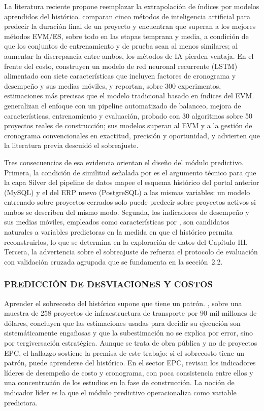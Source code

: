 La literatura reciente propone reemplazar la extrapolación de índices por modelos aprendidos del histórico. \textcite{Wauters2016} comparan cinco métodos de inteligencia artificial para predecir la duración final de un proyecto y encuentran que superan a los mejores métodos EVM/ES, sobre todo en las etapas temprana y media, a condición de que los conjuntos de entrenamiento y de prueba sean al menos similares; al aumentar la discrepancia entre ambos, los métodos de IA pierden ventaja. En el frente del costo, \textcite{MLcostForecasting2022} construyen un modelo de red neuronal recurrente (LSTM) alimentado con siete características que incluyen factores de cronograma y desempeño y sus medias móviles, y reportan, sobre 300 experimentos, estimaciones más precisas que el modelo tradicional basado en índices del EVM\@. \textcite{AutoMLpipeline2025} generalizan el enfoque con un pipeline automatizado de balanceo, mejora de características, entrenamiento y evaluación, probado con 30 algoritmos sobre 50 proyectos reales de construcción; sus modelos superan al EVM y a la gestión de cronograma convencionales en exactitud, precisión y oportunidad, y advierten que la literatura previa descuidó el sobreajuste.

Tres consecuencias de esa evidencia orientan el diseño del módulo predictivo. Primera, la condición de similitud señalada por \textcite{Wauters2016} es el argumento técnico para que la capa Silver del pipeline de datos mapee el esquema histórico del portal anterior (MySQL) y el del ERP nuevo (PostgreSQL) a las mismas variables: un modelo entrenado sobre proyectos cerrados solo puede predecir sobre proyectos activos si ambos se describen del mismo modo. Segunda, los indicadores de desempeño y sus medias móviles, empleados como características por \textcite{MLcostForecasting2022}, son candidatos naturales a variables predictoras en la medida en que el histórico permita reconstruirlos, lo que se determina en la exploración de datos del Capítulo III\@. Tercera, la advertencia sobre el sobreajuste de \textcite{AutoMLpipeline2025} refuerza el protocolo de evaluación con validación cruzada agrupada que se fundamenta en la sección~2.2.

\subsubsection{PREDICCIÓN DE DESVIACIONES Y COSTOS}

Aprender el sobrecosto del histórico supone que tiene un patrón. \textcite{Flyvbjerg2002}, sobre una muestra de 258 proyectos de infraestructura de transporte por 90 mil millones de dólares, concluyen que las estimaciones usadas para decidir su ejecución son sistemáticamente engañosas y que la subestimación no se explica por error, sino por tergiversación estratégica. Aunque se trata de obra pública y no de proyectos EPC, el hallazgo sostiene la premisa de este trabajo: si el sobrecosto tiene un patrón, puede aprenderse del histórico. En el sector EPC, \textcite{EPCleadingIndicators2018} revisan los indicadores líderes de desempeño de costo y cronograma, con poca consistencia entre ellos y una concentración de los estudios en la fase de construcción. La noción de indicador líder es la que el módulo predictivo operacionaliza como variable predictora.

